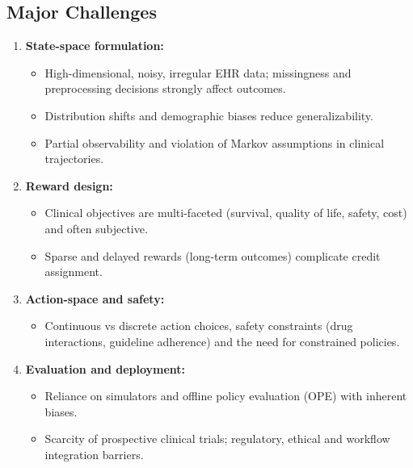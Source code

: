 \subsection*{Major Challenges}
\begin{enumerate}
    \item \textbf{State-space formulation:}
    \begin{itemize}
        \item High-dimensional, noisy, irregular EHR data; missingness and preprocessing decisions strongly affect outcomes.
        \item Distribution shifts and demographic biases reduce generalizability.
        \item Partial observability and violation of Markov assumptions in clinical trajectories.
    \end{itemize}
    \item \textbf{Reward design:}
    \begin{itemize}
        \item Clinical objectives are multi-faceted (survival, quality of life, safety, cost) and often subjective.
        \item Sparse and delayed rewards (long-term outcomes) complicate credit assignment.
    \end{itemize}
    \item \textbf{Action-space and safety:}
    \begin{itemize}
        \item Continuous vs discrete action choices, safety constraints (drug interactions, guideline adherence) and the need for constrained policies.
    \end{itemize}
    \item \textbf{Evaluation and deployment:}
    \begin{itemize}
        \item Reliance on simulators and offline policy evaluation (OPE) with inherent biases.
        \item Scarcity of prospective clinical trials; regulatory, ethical and workflow integration barriers.
    \end{itemize}
\end{enumerate}

